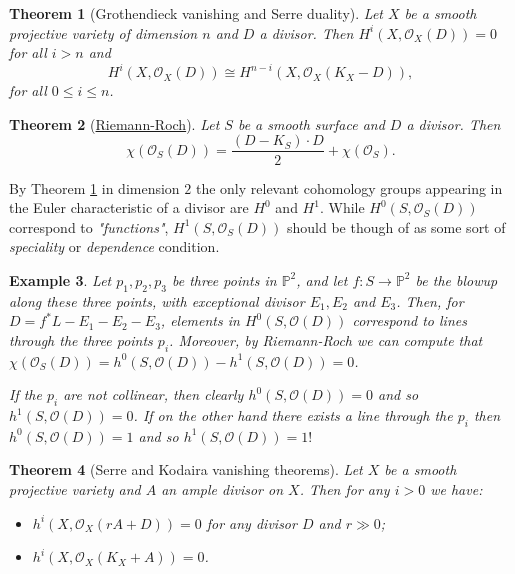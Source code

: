 \documentclass[a4paper,11pt]{amsart}
\newtheorem{theorem}{Theorem}[section]
\newtheorem{example}[theorem]{Example}
\newcommand{\OO}{\mathcal{O}}
\newcommand{\PP}{\mathbb{P}}
\newcommand{\isom}{\cong}
\begin{document}
\begin{theorem}[{Grothendieck vanishing and Serre duality}]\label{thm:GrothSerre}
	Let $X$ be a smooth projective variety of dimension $n$ and $D$ a divisor.
	Then $H^i(X,\OO_X(D)) = 0$ for all $i > n$ and
	\[
	H^i(X,\OO_X(D)) \isom H^{n-i}(X,\OO_X(K_X-D)),
	\]
	for all $0\leq i \leq n$.
\end{theorem}

\begin{theorem}[{\href{https://s-zikas.github.io/site/pics/RR.jpg}{Riemann-Roch}}]
	Let $S$ be a smooth surface and $D$ a divisor.
	Then
	\[
	\chi\left(\OO_S(D)\right) = \frac{(D-K_S)\cdot D}{2} + \chi(\OO_S).
	\]
\end{theorem}

By Theorem \ref{thm:GrothSerre} in dimension $2$ the only relevant cohomology groups appearing in the Euler characteristic of a divisor are $H^0$ and $H^1$.
While $H^0(S,\OO_S(D))$ correspond to \emph{"functions"}, $H^1(S,\OO_S(D))$ should be though of as some sort of \emph{speciality} or \emph{dependence} condition.

\begin{example}
	Let $p_1,p_2,p_3$ be three points in $\PP^2$, and let $f\colon S \to \PP^2$ be the blowup along these three points, with exceptional divisor $E_1,E_2$ and $E_3$.
	Then, for $D = f^*L - E_1 - E_2 - E_3$, elements in $H^0(S,\OO(D))$ correspond to lines through the three points $p_i$.
	Moreover, by Riemann-Roch we can compute that $\chi(\OO_S(D)) = h^0(S,\OO(D)) - h^1(S,\OO(D)) = 0$.
	
	If the $p_i$ are not collinear, then clearly $h^0(S,\OO(D)) = 0$ and so $h^1(S,\OO(D)) = 0$.
	If on the other hand there exists a line through the $p_i$ then $h^0(S,\OO(D)) = 1$ and so $h^1(S,\OO(D)) = 1!$
\end{example}





\begin{theorem}[{Serre and Kodaira vanishing theorems}]\label{thm:SerreKodairaVanishing}
	Let $X$ be a smooth projective variety and $A$ an ample divisor on $X$.
	Then for any $i>0$ we have:
	\begin{itemize}
		\item $h^i(X,\OO_X(rA + D)) = 0$ for any divisor $D$ and $r\gg 0$;
		\item $h^i(X,\OO_X(K_X + A)) = 0$.
	\end{itemize}
\end{theorem}
\end{document}
